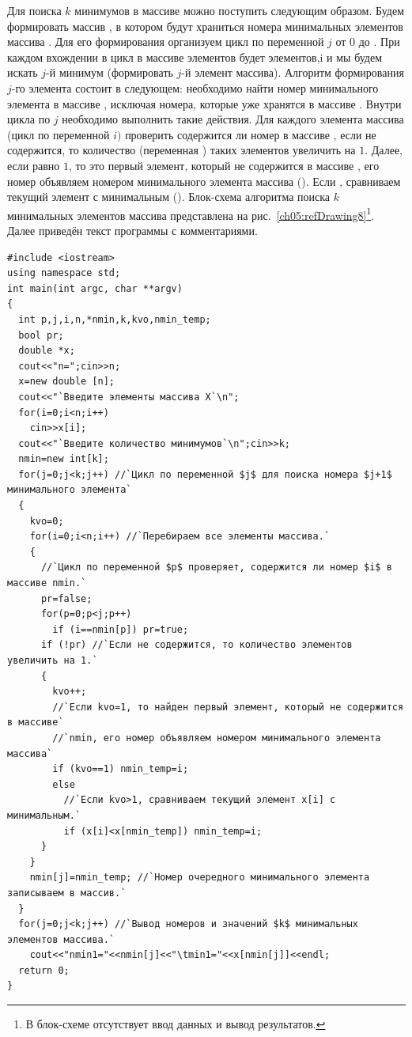 Для поиска $k$ минимумов в массиве можно поступить следующим образом. Будем формировать массив
, в котором будут храниться номера минимальных элементов массива . Для его
формирования организуем цикл по переменной $j$ от 0 до . При
каждом вхождении в цикл в массиве  элементов будет  элементов,i и мы будем
искать $j$-й минимум (формировать $j$-й элемент массива). Алгоритм формирования
$j$-го элемента состоит в следующем: необходимо найти номер минимального элемента в массиве ,
исключая номера, которые уже хранятся в массиве . Внутри цикла по $j$
необходимо выполнить такие действия. Для каждого элемента массива  (цикл по переменной
$i)$ проверить содержится ли номер в массиве , если не содержится, то
количество (переменная ) таких элементов увеличить на $1$. Далее, если
 равно $1$, то это первый элемент, который не содержится в массиве
, его номер объявляем номером минимального элемента массива ().
Если , сравниваем текущий элемент
 с минимальным ().
Блок-схема алгоритма поиска $k$ минимальных элементов массива представлена на рис.~\ref{ch05:refDrawing8}\footnote{В
блок-схеме отсутствует ввод данных и вывод результатов.}.  Далее приведён текст программы с комментариями.
\begin{lstlisting}
#include <iostream>
using namespace std;
int main(int argc, char **argv)
{
  int p,j,i,n,*nmin,k,kvo,nmin_temp;
  bool pr;
  double *x;
  cout<<"n=";cin>>n;
  x=new double [n];
  cout<<"`Введите элементы массива Х`\n";
  for(i=0;i<n;i++)
    cin>>x[i];
  cout<<"`Введите количество минимумов`\n";cin>>k;
  nmin=new int[k];
  for(j=0;j<k;j++) //`Цикл по переменной $j$ для поиска номера $j+1$ минимального элемента`
  {
    kvo=0;
    for(i=0;i<n;i++) //`Перебираем все элементы массива.`
    {
      //`Цикл по переменной $p$ проверяет, содержится ли номер $i$ в массиве nmin.`
      pr=false;
      for(p=0;p<j;p++)
        if (i==nmin[p]) pr=true;
      if (!pr) //`Если не содержится, то количество элементов увеличить на 1.`
      {
        kvo++;
        //`Если kvo=1, то найден первый элемент, который не содержится в массиве`
        //`nmin, его номер объявляем номером минимального элемента массива`
        if (kvo==1) nmin_temp=i;
        else
          //`Если kvo>1, сравниваем текущий элемент x[i] с минимальным.`
          if (x[i]<x[nmin_temp]) nmin_temp=i;
      }
    }
    nmin[j]=nmin_temp; //`Номер очередного минимального элемента записываем в массив.`		
  }
  for(j=0;j<k;j++) //`Вывод номеров и значений $k$ минимальных элементов массива.`
    cout<<"nmin1="<<nmin[j]<<"\tmin1="<<x[nmin[j]]<<endl;
  return 0;
}
\end{lstlisting}

